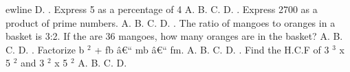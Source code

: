 \documentclass{article}
\begin{document}
\begin{multicols}{2}
ewline \indent D.  \newline{}. Express 5 as a percentage of 4 \newline \indent A. \newline \indent B. \newline \indent C. \newline \indent D.  \newline{}. Express 2700 as a product of prime numbers. \newline \indent A. \newline \indent B. \newline \indent C. \newline \indent D.  \newline{}. The ratio of mangoes to oranges in a basket is 3:2. If the are 36 mangoes, how many oranges are in the basket? \newline \indent A. \newline \indent B. \newline \indent C. \newline \indent D.  \newline{}. Factorize b \(^2\) + fb â€“ mb â€“ fm. \newline \indent A. \newline \indent B. \newline \indent C. \newline \indent D.  \newline{}. Find the H.C.F of 3 \(^3\) x 5 \(^2\) and 3 \(^2\) x 5 \(^2\) \newline \indent A. \newline \indent B. \newline \indent C. \newline \indent D. 
\end{multicols}
\end{document}
